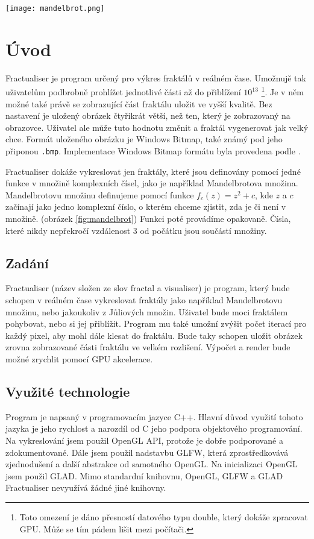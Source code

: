 \begin{figure*}[bh!]
\centering
\texttt{[image: mandelbrot.png]}
\caption{Mandelbrotova množina}
\label{fig:mandelbrot}
\end{figure*}
\section{Úvod}
Fractualiser je program určený pro výkres fraktálů v reálném čase. Umožnujě 
tak uživatelům podbrobně prohlížet jednotlivé části až do přiblížení $10^{13}$
\footnote{Toto omezení je dáno přesností datového typu double, který dokáže
zpracovat GPU. Může se tím pádem lišit mezi počítači.}. Je v něm možné také
právě se zobrazující část fraktálu uložit ve vyšší kvalitě. Bez nastavení je
uložený obrázek čtyřikrát větší, než ten, který je zobrazovaný na obrazovce.
Uživatel ale může tuto hodnotu změnit a fraktál vygenerovat jak velký chce.
Formát uloženého obrázku je Windows Bitmap, také známý pod jeho připonou
\texttt{.bmp}. Implementace Windows Bitmap formátu byla provedena podle
\textcite{bitmapstorage}.

Fractualiser dokáže vykreslovat jen fraktály, které jsou definovány pomocí
jedné funkce v množině komplexních čísel, jako je například Mandelbrotova
množina. Mandelbrotovu množinu definujeme pomocí funkce $f_c(z) = z^2+c$, kde
$z$ a $c$ začínají jako jedno komplexní číslo, o kterém chceme zjistit, zda je
či není v množině. (obrázek \ref{fig:mandelbrot}) Funkci poté provádíme 
opakovaně. Čísla, které nikdy nepřekročí vzdálenost 3 od počátku jsou součástí
množiny.\autocite{mandelbrotwiki}

\subsection{Zadání}
Fractualiser (název složen ze slov fractal a visualiser) je program, který bude
schopen v reálném čase vykreslovat fraktály jako například Mandelbrotovu
množinu, nebo jakoukoliv z Jůliových množin. Uživatel bude moci fraktálem
pohybovat, nebo si jej přiblížit. Program mu také umožní zvýšit počet iterací
pro každý pixel, aby mohl dále klesat do fraktálu. Bude taky schopen uložit
obrázek zrovna zobrazované části fraktálu ve velkém rozlišení. Výpočet a render
bude možné zrychlit pomocí GPU akcelerace.

\subsection{Využité technologie}
Program je napsaný v programovacím jazyce C++. Hlavní důvod využití tohoto
jazyka je jeho rychlost a narozdíl od C jeho podpora objektového programování.
Na vykreslování jsem použil OpenGL API, protože je dobře podporované a
zdokumentované. Dále jsem použil nadstavbu GLFW, která zprostředkovává
zjednodušení a další abstrakce od samotného OpenGL. Na inicializaci OpenGL jsem
použil GLAD. Mi\-mo standardní knihovnu, OpenGL, GLFW a GLAD Fractualiser
nevyužívá žádné jiné kni\-hov\-ny.

